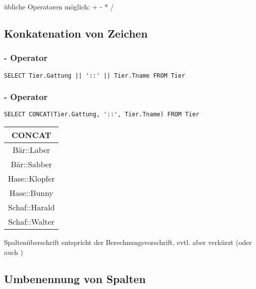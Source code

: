     \begin{tcolorbox}[blue, title={Hinweis}]
        übliche Operatoren möglich:  + - * /
    \end{tcolorbox}

\subsection{Konkatenation von Zeichen}
    \subsubsection{\rCode{||} - Operator}
        \begin{lstlisting}[style=sqlstyle]
            SELECT Tier.Gattung || '::' || Tier.Tname FROM Tier
        \end{lstlisting}

    \subsubsection{  - Operator}
        \begin{lstlisting}[style=sqlstyle]
            SELECT CONCAT(Tier.Gattung, '::', Tier.Tname) FROM Tier
        \end{lstlisting}

    \begin{table}[H]
        \centering
        \begin{tabular}{|c|}
            \hline
            \textbf{CONCAT} \\
            \hline
            Bär::Laber \\
            Bär::Sabber \\
            Hase::Klopfer \\
            Hase::Bunny \\
            Schaf::Harald \\
            Schaf::Walter \\
            \hline
        \end{tabular}
    \end{table}

    \begin{tcolorbox}[blue, title={Hinweis}]
        Spaltenüberschrift entspricht der Berechnungsvorschrift, evtl. aber verkürzt (oder auch )
    \end{tcolorbox}

\subsection{Umbenennung von Spalten}

